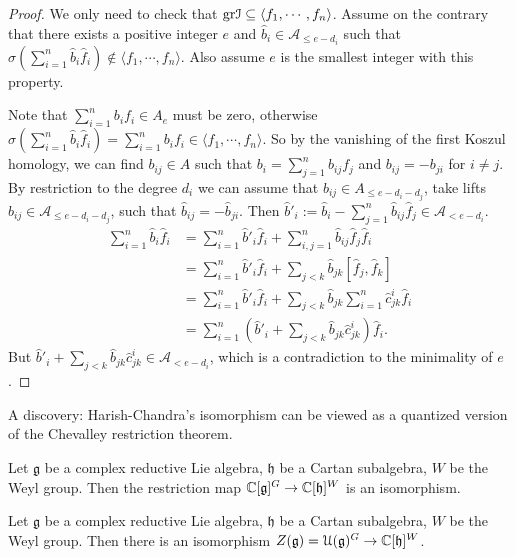 \documentclass[12pt]{amsart}
\numberwithin{equation}{section}
\newcommand{\CA}{{\mathcal {A}}} \newcommand{\CB}{{\mathcal {B}}} \newcommand{\CC}{{\mathcal {C}}}
\newcommand{\fg}{\mathfrak{g}} \newcommand{\fh}{\mathfrak{h}} \newcommand{\fk}{\mathfrak{k}}
\newcommand{\gr}{{\mathrm{gr}}}   \newcommand{\Sym}{{\mathrm{Sym}}}
\renewcommand{\hat}{\widehat}
\begin{document}
\begin{proof}
  We only need to check that $\gr \CI \subseteq \langle f_1, \cdots, f_n\rangle$. Assume on the contrary that there exists a positive integer $e$ and $\hat{b}_i \in \CA_{\leq e-d_i}$ such that $\sigma(\sum_{i=1}^{n} \hat{b}_i \hat{f}_i) \notin \langle f_1, \cdots, f_n\rangle$. Also assume $e$ is the smallest integer with this property.
  
  Note that $\sum_{i=1}^{n} b_i f_i \in A_{e}$ must be zero, otherwise $\sigma(\sum_{i=1}^{n} \hat{b}_i \hat{f}_i) = \sum_{i=1}^{n} b_i f_i \in \langle f_1, \cdots, f_n\rangle$. So by the vanishing of the first Koszul homology, we can find $b_{ij} \in A$ such that $b_i = \sum_{j=1}^{n} b_{ij} f_j$ and $b_{ij} = -b_{ji}$ for $i \neq j$. By restriction to the degree $d_i$ we can assume that $b_{ij} \in A_{\leq e-d_i - d_j}$, take lifts $\hat{b}_{ij} \in \CA_{\leq e-d_i - d_j}$, such that $\hat{b}_{ij} = -\hat{b}_{ji}$. Then $\hat{b}'_i := \hat{b}_i - \sum_{j=1}^{n} \hat{b}_{ij} \hat{f}_j \in \CA_{< e - d_i}$.
  \begin{align*}
    \sum_{i=1}^{n} \hat{b}_i \hat{f}_i &= \sum_{i=1}^{n} \hat{b}'_i \hat{f}_i + \sum_{i,j=1}^{n} \hat{b}_{ij} \hat{f}_j \hat{f}_i \\
    &= \sum_{i=1}^{n} \hat{b}'_i \hat{f}_i +  \sum_{j < k} \hat{b}_{jk} [\hat{f}_j, \hat{f}_k] \\
    &= \sum_{i=1}^{n} \hat{b}'_i \hat{f}_i +  \sum_{j < k} \hat{b}_{jk} \sum_{i = 1}^{n} \hat{c}_{jk}^i \hat{f}_i \\
    &= \sum_{i=1}^{n} \left( \hat{b}'_i + \sum_{j < k} \hat{b}_{jk} \hat{c}_{jk}^i \right) \hat{f}_i.
  \end{align*}
  But $\hat{b}'_i + \sum_{j < k} \hat{b}_{jk} \hat{c}_{jk}^i \in \CA_{< e - d_i}$, which is a contradiction to the minimality of $e$.
\end{proof}


A discovery: Harish-Chandra's isomorphism can be viewed as a quantized version of the Chevalley restriction theorem.

\begin{thm}
  Let $\fg$ be a complex reductive Lie algebra, $\fh$ be a Cartan subalgebra, $W$ be the Weyl group. Then the restriction map $\BC[\fg]^G \to \BC[\fh]^W$ is an isomorphism.
\end{thm}

\begin{thm}
  Let $\fg$ be a complex reductive Lie algebra, $\fh$ be a Cartan subalgebra, $W$ be the Weyl group. Then there is an isomorphism $Z(\fg) = \CU(\fg)^{G} \to \BC[\fh]^W$.
\end{thm}
\end{document}
